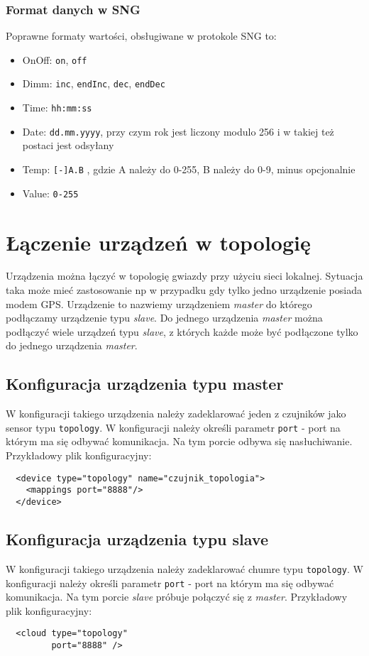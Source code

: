 \documentclass[11pt]{article}
\begin{document}
\subsubsection{Format danych w SNG}
Poprawne formaty wartości, obsługiwane w protokole SNG to:
\begin{itemize}

\item OnOff: \verb|on|, \verb|off|
\item Dimm: \verb|inc|, \verb|endInc|, \verb|dec|, \verb|endDec|
\item Time: \verb|hh:mm:ss|
\item Date: \verb|dd.mm.yyyy|, przy czym rok jest liczony modulo 256 i w takiej też postaci jest odsyłany
\item Temp: \verb|[-]A.B| , gdzie A należy do 0-255, B należy do 0-9,  minus opcjonalnie
\item Value: \verb|0-255| 
\end{itemize}


\section{Łączenie urządzeń w topologię}
Urządzenia można łączyć w topologię gwiazdy przy użyciu sieci lokalnej. Sytuacja taka może mieć zastosowanie np w przypadku
gdy tylko jedno urządzenie posiada modem GPS. Urządzenie to nazwiemy urządzeniem \textit{master} do którego podłączamy urządzenie typu
\textit{slave}. Do jednego urządzenia \textit{master} można podłączyć wiele urządzeń typu \textit{slave}, z których każde może być podłączone
tylko do jednego urządzenia \textit{master}.

\subsection{Konfiguracja urządzenia typu master}
W konfiguracji takiego urządzenia należy zadeklarować jeden z czujników jako sensor typu \verb|topology|. W konfiguracji
należy określi parametr \verb|port| - port na którym ma się odbywać komunikacja. Na tym porcie odbywa się nasłuchiwanie.
Przykładowy plik konfiguracyjny:
\begin{verbatim}
  <device type="topology" name="czujnik_topologia">
    <mappings port="8888"/>
  </device>
\end{verbatim}

\subsection{Konfiguracja urządzenia typu slave}
W konfiguracji takiego urządzenia należy zadeklarować chumre typu \verb|topology|. W konfiguracji
należy określi parametr \verb|port| - port na którym ma się odbywać komunikacja. Na tym porcie \textit{slave} próbuje połączyć
się z \textit{master}. Przykładowy plik konfiguracyjny:
\begin{verbatim}
  <cloud type="topology" 
         port="8888" />
\end{verbatim}
\end{document}
